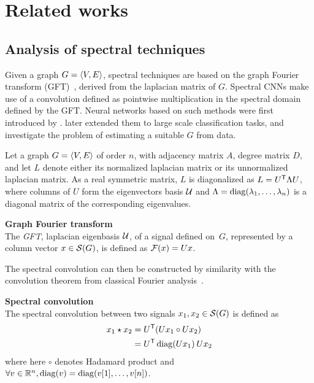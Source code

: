 \section{Related works}




\subsection{Analysis of spectral techniques}

Given a graph $\gve$, spectral techniques are based on the graph Fourier transform (GFT)~\citep{chung1996spectral,shuman2013emerging}, derived from the laplacian matrix of $G$. Spectral CNNs make use of a convolution defined as pointwise multiplication in the spectral domain defined by the GFT. Neural networks based on such methods were first introduced by \cite{bruna2013spectral}. \cite{henaff2015deep} later extended them to large scale classification tasks, and investigate the problem of estimating a suitable $G$ from data.

Let a graph $\gve$ of order $n$, with adjacency matrix $A$, degree matrix $D$, and let $L$ denote either its normalized laplacian matrix or its unnormalized laplacian matrix. As a real symmetric matrix, $L$ is diagonalized as $L = U^{\T} \Lambda U$, where columns of $U$ form the eigenvectors basis $\cu$ and $\Lambda = \diag(\lambda_1, \ldots , \lambda_n)$ is a diagonal matrix of the corresponding eigenvalues. 

\begin{definition}\textbf{Graph Fourier transform}\\
The \emph{GFT}, \wrt laplacian eigenbasis $\cu$, of a signal defined on~$G$, represented by a column vector $x \in \cs(G)$, is defined as $\cf(x) = Ux$.
\end{definition}

The spectral convolution can then be constructed by similarity with the convolution theorem from classical Fourier analysis~\citep{wiki:conv}.

\begin{definition}\textbf{Spectral convolution}\\
The spectral convolution between two signals $x_1, x_2 \in \cs(G)$ is defined as
\begin{align*}
x_1 \star x_2 & = U^{\T}(Ux_1 \circ Ux_2)\\
 & = U^{\T} \diag(Ux_1) \h{2} Ux_2
\end{align*}
where here $\circ$ denotes Hadamard product and $\forall v \in \bbr^n, \diag(v) = \diag(v[1], \ldots, v[n])$.
\end{definition}

